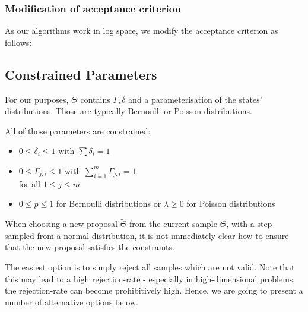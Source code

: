 \subsubsection{Modification of acceptance criterion}
As our algorithms work in log space, we modify the acceptance criterion as follows:

\subsection{Constrained Parameters}
For our purposes, $\Theta$ contains $\Gamma, \delta$ and a parameterisation of the states' distributions. Those are typically Bernoulli or Poisson distributions. 

All of those parameters are constrained:
\begin{itemize}
	\item $0 \leq \delta_i \leq 1$ with $\sum \delta_i = 1$ \\
	\item $0 \leq \Gamma_{j, i} \leq 1$ with $ \sum\limits_{i=1}^m \Gamma_{j, i} = 1$ \\
		for all $ 1 \leq j \leq m$
	\item $ 0 \leq p \leq 1$ for Bernoulli distributions or $\lambda \geq 0$ for Poisson distributions
\end{itemize}

When choosing a new proposal $\tilde{\Theta}$ from the current sample $\Theta$, with a step sampled from a normal distribution, it is not immediately clear how to ensure that the new proposal satisfies the constraints. 

The easiest option is to simply reject all samples which are not valid. Note that this may lead to a high rejection-rate - especially in high-dimensional problems, the rejection-rate can become prohibitively high. Hence, we are going to present a number of alternative options below. 


